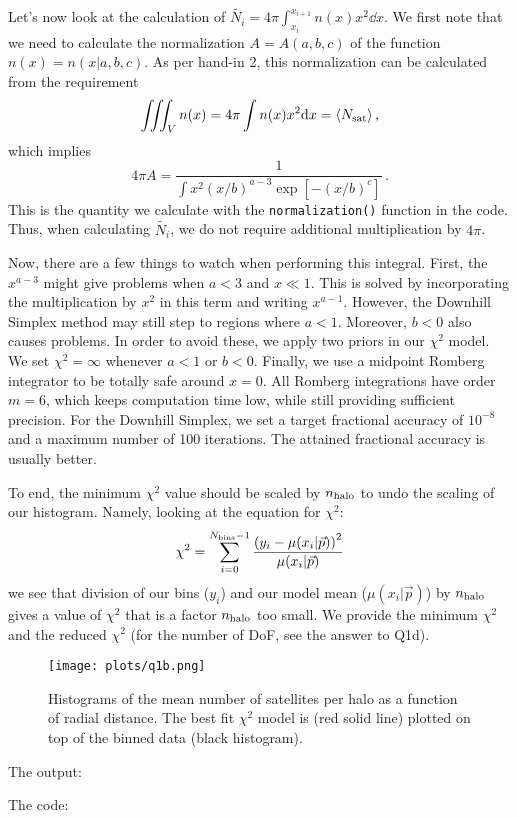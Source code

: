Let's now look at the calculation of $\tilde{N_{i}} = 4 \pi \int_{x_{i}}^{x_{i+1}} n(x) x^{2} \dd x$. We first note that we need to calculate the
normalization $A = A(a,b,c)$ of the function $n(x) = n(x|a,b,c)$. As per hand-in 2, this normalization can be calculated from the requirement
\begin{equation}
    \iiint_{V} n(x) = 4 \pi \int n(x) x^{2} \mathrm{d} x = \langle N_{\rm sat} \rangle \, ,
\end{equation}
which implies
\begin{equation}
    4 \pi A = \frac{1}{\int x^2 (x/b)^{a-3} \exp \left[- (x/b)^{c} \right]} \, .
\end{equation}
This is the quantity we calculate with the \texttt{normalization()} function in the code. Thus, when calculating $\tilde{N_{i}}$, we do not
require additional multiplication by $4 \pi$.

Now, there are a few things to watch when performing this integral. First, the $x^{a - 3}$ might give problems when $a < 3$ and $x \ll 1$. 
This is solved by incorporating the multiplication by $x^2$ in this term and writing $x^{a - 1}$. However, the Downhill Simplex method may
still step to regions where $a < 1$. Moreover, $b < 0$ also causes problems. In order to avoid these, we apply two priors in our $\chi^2$ 
model. We set $\chi^2 = \infty$ whenever $a < 1$ or $b < 0$. Finally, we use a midpoint Romberg integrator to be totally safe around $x = 0$.
All Romberg integrations have order $m = 6$, which keeps computation time low, while still providing sufficient precision.
For the Downhill Simplex, we set a target fractional accuracy of $10^{-8}$ and a maximum number of 100 iterations. 
The attained fractional accuracy is usually better.

To end, the minimum $\chi^2$ value should be scaled by $n_{\rm halo}$ to undo the scaling of our histogram. Namely, looking at the equation
for $\chi^2$:
\begin{equation}
    \chi^2 = \sum_{i = 0}^{N_{\rm bins} - 1} \frac{\left(y_{i} - \mu(x_{i} | \vec{p}) \right)^{2}}{\mu(x_{i} | \vec{p})}
\end{equation}
we see that division of our bins ($y_{i}$) and our model mean ($\mu(x_{i} | \vec{p})$) by $n_{\rm halo}$ gives a value of $\chi^2$ that is 
a factor $n_{\rm halo}$ too small. We provide the minimum $\chi^2$ and the reduced $\chi^2$ (for the number of DoF, see the answer to Q1d).

\begin{figure}[H]
    \centering
    \texttt{[image: plots/q1b.png]}
    \caption{Histograms of the mean number of satellites per halo as a function of radial distance. The best fit $\chi^{2}$ model is
    (red solid line) plotted on top of the binned data (black histogram).
    }
\end{figure}

\noindent The output:



\noindent The code:

